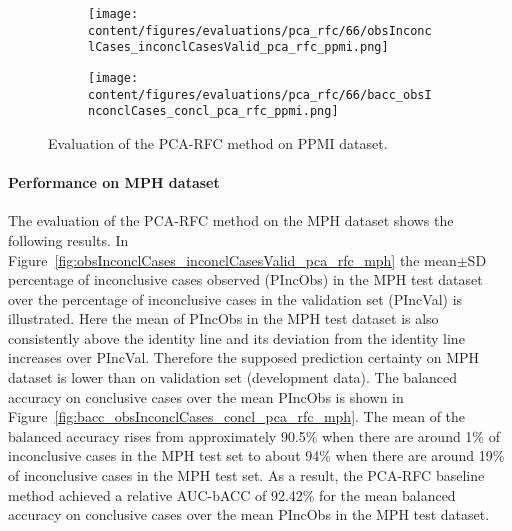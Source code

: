 \begin{figure}[ht]
  \begin{subfigure}{0.49\textwidth}
    \centering
    \texttt{[image: content/figures/evaluations/pca\_rfc/66/obsInconclCases\_inconclCasesValid\_pca\_rfc\_ppmi.png]}
    \label{fig:obsInconclCases_inconclCasesValid_pca_rfc_ppmi}
  \end{subfigure}
  \hfill
  \begin{subfigure}{0.49\textwidth}
    \centering
    \texttt{[image: content/figures/evaluations/pca\_rfc/66/bacc\_obsInconclCases\_concl\_pca\_rfc\_ppmi.png]}
    \label{fig:bacc_obsInconclCases_concl_pca_rfc_ppmi}
  \end{subfigure}
  \caption{Evaluation of the PCA-RFC method on PPMI dataset.}
  \label{fig:perf_results_rfc_ppmi}
\end{figure}




\paragraph{Performance on MPH dataset}

The evaluation of the PCA-RFC method on the MPH dataset shows the following results.
In Figure~\ref{fig:obsInconclCases_inconclCasesValid_pca_rfc_mph} 
the mean$\pm$SD percentage of inconclusive cases observed (PIncObs) in the MPH test dataset 
over the percentage of inconclusive cases in the validation set (PIncVal) is illustrated.
Here the mean of PIncObs in the MPH test dataset
is also consistently above the identity line and its deviation from the identity line increases over PIncVal.
Therefore the supposed prediction certainty on MPH dataset is lower than on validation set (development data).
The balanced accuracy on conclusive cases over the mean PIncObs is shown 
in Figure~\ref{fig:bacc_obsInconclCases_concl_pca_rfc_mph}.
The mean of the balanced accuracy rises from approximately 90.5\% 
when there are around 1\% of inconclusive cases in the MPH test set to about 94\% 
when there are around 19\% of inconclusive cases in the MPH test set.
As a result, the PCA-RFC baseline method achieved a relative AUC-bACC of 92.42\% for the mean balanced accuracy on conclusive cases 
over the mean PIncObs in the MPH test dataset.


